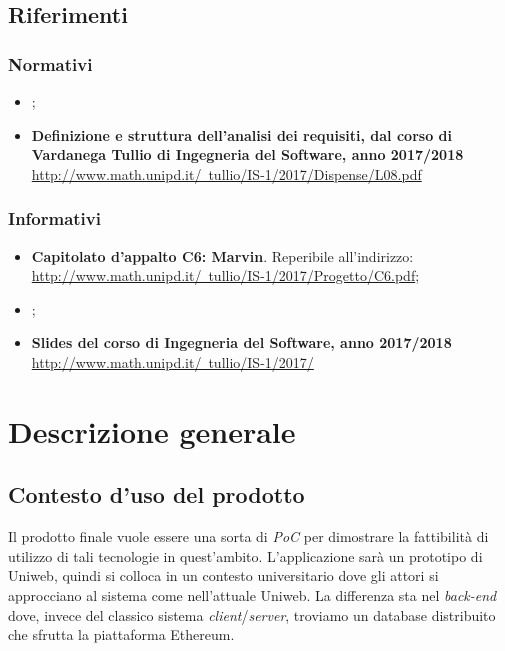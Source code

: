 \subsection{Riferimenti}
\subsubsection{Normativi}
\begin{itemize}
	\item \textbf{\NdP{}};
	\item \textbf{Definizione e struttura dell'analisi dei requisiti, dal corso di Vardanega Tullio di Ingegneria del Software, anno 2017/2018}
	\href{http://www.math.unipd.it/~tullio/IS-1/2017/Dispense/L08.pdf}{http://www.math.unipd.it/~tullio/IS-1/2017/Dispense/L08.pdf}
	
\end{itemize}

\subsubsection{Informativi}
\begin{itemize}
	\item \textbf{Capitolato d'appalto C6: Marvin}. Reperibile all'indirizzo:\\ 
	\href{http://www.math.unipd.it/~tullio/IS-1/2017/Progetto/C6.pdf}{http://www.math.unipd.it/~tullio/IS-1/2017/Progetto/C6.pdf};
	\item \textbf{\SdF};
	\item \textbf{Slides del corso di Ingegneria del Software, anno 2017/2018}
	\href{http://www.math.unipd.it/~tullio/IS-1/2017/}{http://www.math.unipd.it/~tullio/IS-1/2017/}
\end{itemize}

\section{Descrizione generale}
	\subsection{Contesto d'uso del prodotto}
	Il prodotto finale vuole essere una sorta di \emph{PoC} per dimostrare la fattibilità di utilizzo di tali tecnologie in quest’ambito. L’applicazione sarà un prototipo di Uniweb, quindi si colloca in un contesto universitario dove gli attori si approcciano al sistema come nell’attuale Uniweb. La differenza sta nel \emph{back-end} dove, invece del classico sistema \emph{client}/\emph{server}, troviamo un database distribuito che sfrutta la piattaforma Ethereum.
	
